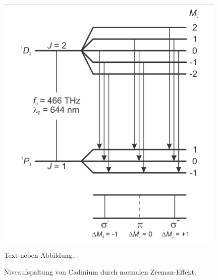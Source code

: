     \begin{figure}[H]
        \centering
        \begin{minipage}{0.35\textwidth}
            \centering
            \includegraphics[width=\linewidth]{figs/Zeeman_Übergänge.png}
            \caption{Niveaufspaltung von Cadmium durch normalen Zeeman-Effekt. \cite{Zeemann-Effekt_LD-Handblätter}}
        \end{minipage} 
        \hspace{1cm}
        \begin{minipage}{0.4\textwidth}
            Text neben Abbildung...
        \end{minipage}
    \end{figure}


